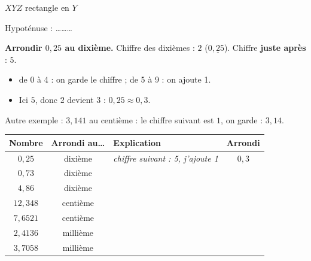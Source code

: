 \documentclass[11pt]{article}
\newenvironment{exempletraite}
{\begin{tcolorbox}[colback=white, colframe=black, boxrule=0.3mm,
    sharp corners, fonttitle=\bfseries, coltitle=black,
    colbacktitle=black!10, title={Exemple traité}, before skip=2pt,
    after skip=4pt, top=2pt, bottom=2pt]}
{\end{tcolorbox}}
\newcommand{\rep}{\rule{0pt}{4.5ex}}
\begin{document}
\begin{exercicedevoir}[4][Hypoténuse]
\begin{minipage}[b]{0.24\linewidth}
\vspace{0.3em}
$XYZ$ rectangle en $Y$

\vspace{0.4em}
Hypoténuse : \ldots\ldots\ldots
\end{minipage}
\end{exercicedevoir}

\begin{exercicedevoir}[5][Arrondis]
\begin{exempletraite}
\textbf{Arrondir $0{,}25$ au dixième.} Chiffre des dixièmes : $2$
($0{,}\underline{2}5$). Chiffre \textbf{juste après} : $5$.
\begin{itemize}[nosep]
\item de 0 à 4 : on garde le chiffre ; \quad de 5 à 9 : on ajoute 1.
\item Ici $5$, donc $2$ devient $3$ : \textbf{$0{,}25 \approx 0{,}3$}.
\end{itemize}
Autre exemple : $3{,}141$ au centième : le chiffre suivant est $1$, on
garde : $3{,}14$.
\end{exempletraite}

\renewcommand{\arraystretch}{1.2}
\begin{center}
\begin{tabular}{|c|c|p{6.5cm}|c|}
\hline
\textbf{Nombre} & \textbf{Arrondi au\ldots} & \textbf{Explication} &
\textbf{Arrondi} \\ \hline
$0{,}25$ & dixième & \textit{chiffre suivant : 5, j'ajoute 1} &
$0{,}3$ \\ \hline
$0{,}73$ & dixième & \rep & \\ \hline
$4{,}86$ & dixième & \rep & \\ \hline
$12{,}348$ & centième & \rep & \\ \hline
$7{,}6521$ & centième & \rep & \\ \hline
$2{,}4136$ & millième & \rep & \\ \hline
$3{,}7058$ & millième & \rep & \\ \hline
\end{tabular}
\end{center}
\end{exercicedevoir}
\end{document}
